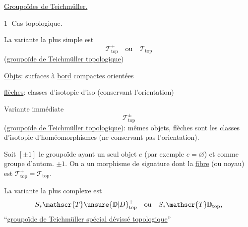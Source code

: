 \uline{Groupoïdes de Teichmüller.}

\textcircled{1} Cas topologique.

La variante la plus simple est
\[
\mathscr{T}_{\mathrm{top}}^{+}\quad\text{ou}\quad\mathscr{T}_{\mathrm{top}}
\]
(\uline{groupoïde de Teichmüller  topologique})


\uline{Objts}: surfaces à \uline{bord} compactes orientées

\uline{flèches}: classes d'isotopie d'iso (conservant l'orientation)

Variante immédiate
\[
\mathscr{T}_{\mathrm{top}}^{\pm}
\]
(\uline{groupoïde de Teichmüller  topologique}): mêmes objets, flèches sont les classes d'isotopie d'homéomorphismes (ne conservant pas  l'orientation).

Soit $[\pm1]$ le groupoïde ayant un seul objet $e$ (par exemple $e=\varnothing$) et comme groupe d'autom. $\pm1$. On a un morphisme de signature
dont la \uline{fibre}  (ou noyau) est $\mathscr{T}_{\mathrm{top}}^{+}=\mathscr{T}_{\mathrm{top}}$.


La variante la plus complexe est
\[
S_{*}\mathscr{T}\unsure{\mathbb{D}|D}_{\mathrm{top}}^{+}\quad\text{ou}\quad S_{*}\mathscr{T}\mathbb{D}_{\mathrm{top}},
\]
``\uline{groupoïde de Teichmüller  spécial dévissé topologique}''

